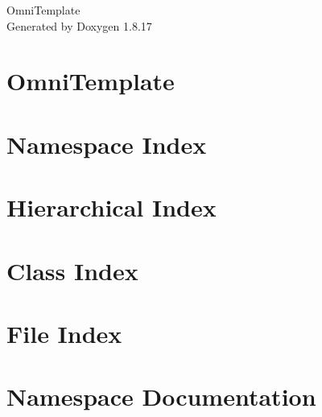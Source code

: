 \let\mypdfximage\pdfximage\def\pdfximage{\immediate\mypdfximage}\documentclass[twoside]{book}
\newcommand{\+}{\discretionary{\mbox{\scriptsize$\hookleftarrow$}}{}{}}
\newcommand{\clearemptydoublepage}{%
  \newpage{\pagestyle{empty}\cleardoublepage}%
}
\begin{document}
\hypersetup{pageanchor=false,
             bookmarksnumbered=true,
             pdfencoding=unicode
            }
\begin{titlepage}
\vspace*{7cm}
\begin{center}%
{\Large Omni\+Template }\\
\vspace*{1cm}
{\large Generated by Doxygen 1.8.17}\\
\end{center}
\end{titlepage}
\clearemptydoublepage
{}
\tableofcontents
\clearemptydoublepage
{}
\hypersetup{pageanchor=true}

\chapter{Omni\+Template}
\label{md__home_ram_OmniTemplate_README}

\chapter{Namespace Index}

\chapter{Hierarchical Index}

\chapter{Class Index}

\chapter{File Index}

\chapter{Namespace Documentation}


















\end{document}
